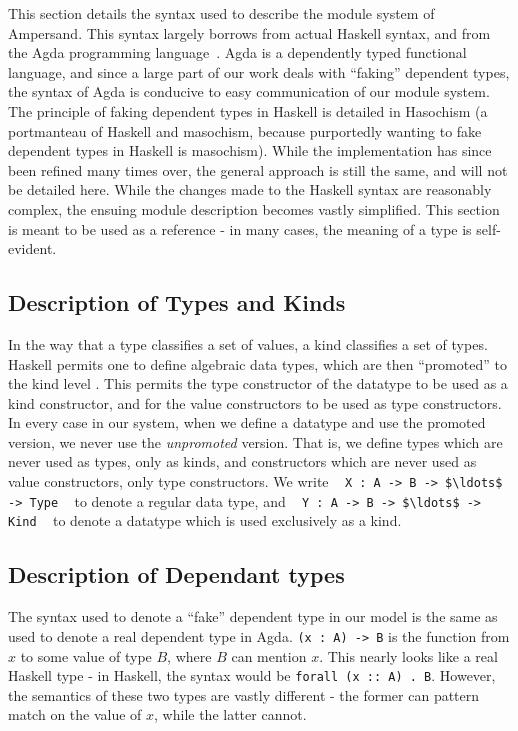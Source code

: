 This section details the syntax used to describe the module system of
Ampersand. This syntax largely borrows from actual Haskell syntax, and from the
Agda programming language~\cite{agda}.
Agda is a dependently typed functional
language, and since a large part of our work deals with ``faking'' dependent
types, the syntax of Agda is conducive to easy communication of our module 
system. The
principle of faking dependent types in Haskell is detailed in
Hasochism \citep{hasochism} 
(a portmanteau of Haskell and masochism, because
purportedly wanting to fake dependent types in Haskell is masochism). While the
implementation has since been refined many times over, the general approach is 
still the
same, and will not be detailed here.
While the changes made to the Haskell syntax are reasonably complex, the 
ensuing 
module description becomes vastly simplified. This section is meant to be used
as a reference - in many cases, the meaning of a type is self-evident. 

\noindent
\subsection*{Description of Types and Kinds}

In the way that a type classifies a set of values, a kind classifies a set of
types. Haskell permits one to define algebraic data types, which are then 
``promoted''
to the kind level \citep{promotion}. 
This permits the type constructor of the datatype to be used
as a kind constructor, and for the value constructors to be used as type 
constructors. In every case in our system, when we define a datatype and use 
the promoted version, we never use the \emph{unpromoted} version. That is, we 
define types which are never used as types, only as kinds, and constructors 
which are never used as value constructors, only type constructors. We write 
\,\,\,
\lstinline!X : A -> B -> $\ldots$ -> Type!
\,\,\, 
to denote a regular data type, and 
\,\,\,
\lstinline!Y : A -> B -> $\ldots$ -> Kind!
\,\,\, 
to denote a datatype
which is used exclusively as a kind. 

\noindent
\subsection*{Description of Dependant types}

The syntax used to denote a ``fake'' dependent type in our model is the same 
as used to denote a real dependent type in Agda. \lstinline!(x : A) -> B! is 
the function
from $x$ to some value of type $B$, where $B$ can mention $x$. This nearly 
looks like a 
real Haskell type - in Haskell, the syntax would be \texttt{forall (x :: A) . 
B}. However, 
the semantics of these two types are vastly different - the former can pattern 
match
on the value of $x$, while the latter cannot. 

